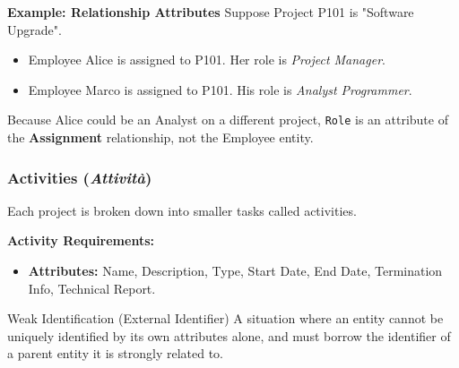 \vspace{0.2cm}
\begin{example}{\textbf{Example: Relationship Attributes}}
Suppose Project P101 is "Software Upgrade".
\begin{itemize}
    \item Employee Alice is assigned to P101. Her role is \textit{Project Manager}.
    \item Employee Marco is assigned to P101. His role is \textit{Analyst Programmer}.
\end{itemize}

\begin{center}
\end{center}
Because Alice could be an Analyst on a different project, \texttt{Role} is an attribute of the \textbf{Assignment} relationship, not the Employee entity.
\end{example}

\subsubsection{Activities (\textit{Attività})}


Each project is broken down into smaller tasks called activities.

\textbf{Activity Requirements:}
\begin{itemize}
    \item \textbf{Attributes:} Name, Description, Type, Start Date, End Date, Termination Info, Technical Report.
\end{itemize}

\begin{defbox}{Weak Identification (External Identifier)}
A situation where an entity cannot be uniquely identified by its own attributes alone, and must borrow the identifier of a parent entity it is strongly related to.
\end{defbox}

